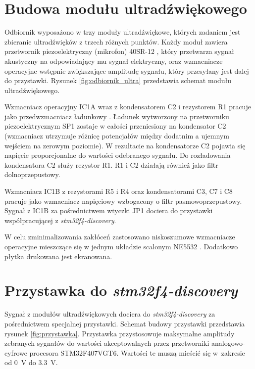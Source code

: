 \section{Budowa modułu ultradźwiękowego}

Odbiornik wyposażono w trzy moduły ultradźwiękowe, których zadaniem jest 
zbieranie ultradźwięków z trzech różnych  punktów.
Każdy moduł zawiera przetwornik piezoelektryczny (mikrofon) 40SR-12 \cite{bib:40ST12},
który przetwarza sygnał akustyczny na odpowiadający mu sygnał elektryczny, oraz wzmacniacze operacyjne 
wstępnie zwiększające amplitudę sygnału, który przesyłany jest dalej do przystawki.
Rysunek \ref{fig:odbiornik_ultra} przedstawia schemat modułu ultradźwiękowego.


Wzmacniacz operacyjny IC1A wraz z kondensatorem C2 i rezystorem R1 pracuje 
jako przedwzmacniacz ładunkowy \cite{bib:wzm_ladunkowy}.
Ładunek wytworzony na przetworniku piezoelektrycznym SP1 zostaje w całości przeniesiony na kondensator C2 
(wzmacniacz utrzymuje różnicę potencjałów między dodatnim a ujemnym wejściem na zerowym poziomie).
W rezultacie na kondensatorze C2 pojawia się napięcie proporcjonalne do wartości odebranego sygnału.
Do rozładowania kondensatora C2 służy rezystor R1.
R1 i C2 działają również jako filtr dolnoprzepustowy.

Wzmacniacz IC1B z rezystorami R5 i R4 oraz kondensatorami C3, C7 i C8 pracuje jako wzmacniacz napięciowy wzbogacony o 
filtr pasmowoprzepustowy.
Sygnał z IC1B za pośrednictwem wtyczki JP1 dociera do przystawki współpracującej z \textit{stm32f4-discovery}.

W celu zminimalizowania zakłóceń zastosowano niskoszumowe wzmacniacze operacyjne
mieszczące się w jednym układzie scalonym NE5532 \cite{bib:ne5532}. 
Dodatkowo płytka drukowana jest ekranowana.


\section{Przystawka do \textit{stm32f4-discovery}}

Sygnał z modułów ultradźwiękowych dociera do \textit{stm32f4-discovery} za pośrednictwem specjalnej przystawki.
Schemat budowy przystawki przedstawia rysunek \ref{fig:przystawka}.
Przystawka przystosowuje maksymalne amplitudy zebranych sygnałów do wartości akceptowalnych przez  
przetworniki analogowo-cyfrowe procesora STM32F407VGT6.
Wartości te muszą mieścić się w~zakresie od \SI{0}{V} do \SI{3,3}{V}.

